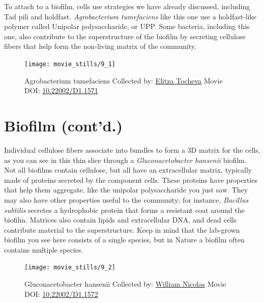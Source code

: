 \documentclass[]{tufte-book}
\begin{document}
To attach to a biofilm, cells use strategies we have already discussed,
including Tad pili and holdfast. \emph{Agrobacterium tumefaciens} like
this one use a holdfast-like polymer called Unipolar polysaccharide, or
UPP. Some bacteria, including this one, also contribute to the
superstructure of the biofilm by secreting cellulose fibers that help
form the non-living matrix of the community.





\begin{figure}
\texttt{[image: movie\_stills/9\_1]} \caption[Agrobacterium tumefaciens Collected by:
\protect\hyperlink{elitza_tocheva}{Elitza Tocheva} Movie DOI:
\href{https://doi.org/10.22002/D1.1571}{10.22002/D1.1571}]{Agrobacterium tumefaciens Collected by:
\protect\hyperlink{elitza_tocheva}{Elitza Tocheva} Movie DOI:
\href{https://doi.org/10.22002/D1.1571}{10.22002/D1.1571}}\label{fig:9-1}
\end{figure}

\section{Biofilm (cont'd.)}\label{biofilm-contd.}

Individual cellulose fibers associate into bundles to form a 3D matrix
for the cells, as you can see in this thin slice through a
\emph{Gluconacetobacter hansenii} biofilm. Not all biofilms contain
cellulose, but all have an extracellular matrix, typically made of
proteins secreted by the component cells. These proteins have properties
that help them aggregate, like the unipolar polysaccharide you just saw.
They may also have other properties useful to the community; for
instance, \emph{Bacillus subtilis} secretes a hydrophobic protein that
forms a resistant coat around the biofilm. Matrices also contain lipids
and extracellular DNA, and dead cells contribute material to the
superstructure. Keep in mind that the lab-grown biofilm you see here
consists of a single species, but in Nature a biofilm often contains
multiple species.





\begin{figure}
\texttt{[image: movie\_stills/9\_2]} \caption[Gluconacetobacter hansenii Collected by:
\protect\hyperlink{william_nicolas}{William Nicolas} Movie DOI:
\href{https://doi.org/10.22002/D1.1572}{10.22002/D1.1572}]{Gluconacetobacter hansenii Collected by:
\protect\hyperlink{william_nicolas}{William Nicolas} Movie DOI:
\href{https://doi.org/10.22002/D1.1572}{10.22002/D1.1572}}\label{fig:9-2}
\end{figure}
\end{document}

